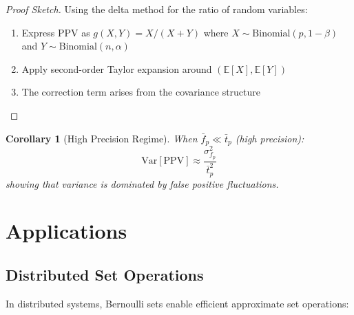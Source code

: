 \documentclass[11pt,final,hidelinks]{article}
\newtheorem{corollary}[theorem]{Corollary}
\newcommand{\fprate}{\alpha}
\newcommand{\fnrate}{\beta}
\begin{document}
\begin{proof}[Proof Sketch]
Using the delta method for the ratio of random variables:
\begin{enumerate}
    \item Express PPV as $g(X,Y) = X/(X+Y)$ where $X \sim \text{Binomial}(p, 1-\fnrate)$ and $Y \sim \text{Binomial}(n, \fprate)$
    \item Apply second-order Taylor expansion around $(\mathbb{E}[X], \mathbb{E}[Y])$
    \item The correction term arises from the covariance structure
\end{enumerate}
\end{proof}

\begin{corollary}[High Precision Regime]
When $\bar{f}_p \ll \bar{t}_p$ (high precision):
\begin{equation}
\text{Var}[\text{PPV}] \approx \frac{\sigma_{f_p}^2}{\bar{t}_p^2}
\end{equation}
showing that variance is dominated by false positive fluctuations.
\end{corollary}

\section{Applications}

\subsection{Distributed Set Operations}

In distributed systems, Bernoulli sets enable efficient approximate set operations:
\end{document}
